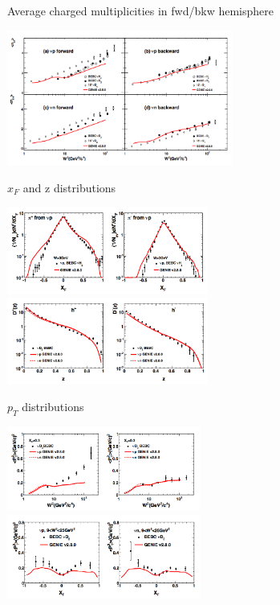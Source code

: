 \begin{frame}{Average charged multiplicities in fwd/bkw hemisphere}

\begin{center}
\includegraphics[width=280px]{./images/nuint/dis/avgnch_vs_W2_FB.png}\\
\end{center}
\end{frame}


\begin{frame}{$x_{F}$ and z distributions}

\begin{center}
\includegraphics[width=250px]{./images/nuint/dis/xF_distribution.png}\\
\includegraphics[width=250px]{./images/nuint/dis/z_distribution.png}\\
\end{center}
\end{frame}

\begin{frame}{$p_{T}$ distributions}

\begin{center}
\includegraphics[width=240px]{./images/nuint/dis/pT2_distribution_1.png}\\
\includegraphics[width=240px]{./images/nuint/dis/pT2_distribution_2.png}\\
\end{center}
\end{frame}


